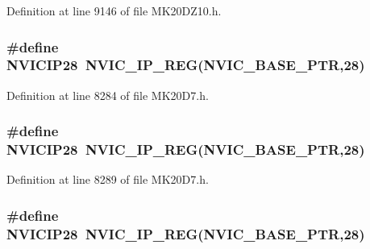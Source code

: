 Definition at line 9146 of file M\+K20\+D\+Z10.\+h.

\subsubsection[{\texorpdfstring{N\+V\+I\+C\+I\+P28}{NVICIP28}}]{\setlength{\rightskip}{0pt plus 5cm}\#define N\+V\+I\+C\+I\+P28~{\bf N\+V\+I\+C\+\_\+\+I\+P\+\_\+\+R\+EG}({\bf N\+V\+I\+C\+\_\+\+B\+A\+S\+E\+\_\+\+P\+TR},28)}\hypertarget{group___n_v_i_c___register___accessor___macros_ga179448e0ec934bd55cfd019b032a0547}{}\label{group___n_v_i_c___register___accessor___macros_ga179448e0ec934bd55cfd019b032a0547}


Definition at line 8284 of file M\+K20\+D7.\+h.

\subsubsection[{\texorpdfstring{N\+V\+I\+C\+I\+P28}{NVICIP28}}]{\setlength{\rightskip}{0pt plus 5cm}\#define N\+V\+I\+C\+I\+P28~{\bf N\+V\+I\+C\+\_\+\+I\+P\+\_\+\+R\+EG}({\bf N\+V\+I\+C\+\_\+\+B\+A\+S\+E\+\_\+\+P\+TR},28)}\hypertarget{group___n_v_i_c___register___accessor___macros_ga179448e0ec934bd55cfd019b032a0547}{}\label{group___n_v_i_c___register___accessor___macros_ga179448e0ec934bd55cfd019b032a0547}


Definition at line 8289 of file M\+K20\+D7.\+h.

\subsubsection[{\texorpdfstring{N\+V\+I\+C\+I\+P28}{NVICIP28}}]{\setlength{\rightskip}{0pt plus 5cm}\#define N\+V\+I\+C\+I\+P28~{\bf N\+V\+I\+C\+\_\+\+I\+P\+\_\+\+R\+EG}({\bf N\+V\+I\+C\+\_\+\+B\+A\+S\+E\+\_\+\+P\+TR},28)}\hypertarget{group___n_v_i_c___register___accessor___macros_ga179448e0ec934bd55cfd019b032a0547}{}\label{group___n_v_i_c___register___accessor___macros_ga179448e0ec934bd55cfd019b032a0547}


